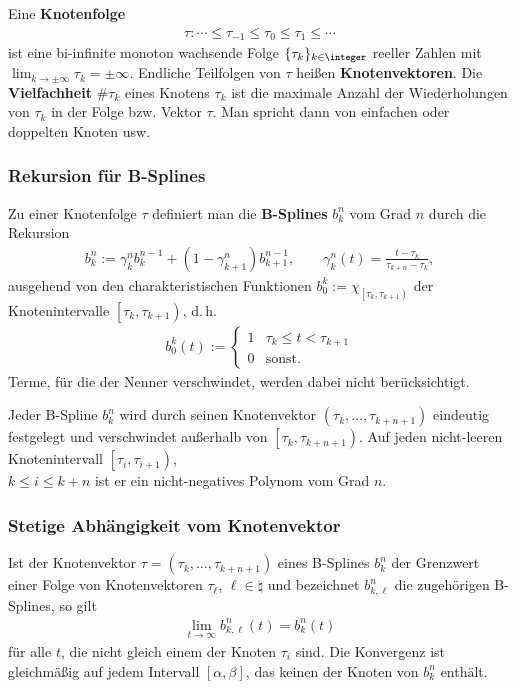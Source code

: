 Eine \textbf{Knotenfolge}
\begin{align*}
    \tau\colon \dotsb \le \tau_{-1} \le \tau_0 \le \tau_1 \le \dotsb
\end{align*}
ist eine bi-infinite monoton wachsende Folge $\{\tau_k\}_{k \in \integer}$
reeller Zahlen mit $\lim_{k \to \pm\infty} \tau_k = \pm\infty$.
Endliche Teilfolgen von $\tau$ heißen \textbf{Knotenvektoren}.
Die \textbf{Vielfachheit} $\#\tau_k$ eines Knotens $\tau_k$ ist die
maximale Anzahl der Wiederholungen von $\tau_k$ in der Folge bzw.
Vektor $\tau$.
Man spricht dann von einfachen oder doppelten Knoten usw.

\subsubsection{%
    Rekursion für B-Splines%
}

Zu einer Knotenfolge $\tau$ definiert man die \textbf{B-Splines} $b_k^n$
vom Grad $n$ durch die Rekursion
\begin{align*}
    b_k^n := \gamma_k^n b_k^{n-1} + (1 - \gamma_{k+1}^n)b_{k+1}^{n-1}, \qquad
    \gamma_k^n(t) = \frac{t - \tau_k}{\tau_{k+n} - \tau_k},
\end{align*}
ausgehend von den charakteristischen Funktionen
$b_0^k := \chi_{\left[\tau_k, \tau_{k+1}\right)}$ der Knotenintervalle
$\left[\tau_k, \tau_{k+1}\right)$, d.\,h.
\begin{align*}
    b_0^k(t) := \begin{cases}1 & \tau_k \le t < \tau_{k+1} \\
    0 & \text{sonst}.\end{cases}
\end{align*}
Terme, für die der Nenner verschwindet, werden dabei nicht berücksichtigt.

\linie

Jeder B-Spline $b_k^n$ wird durch seinen Knotenvektor
$(\tau_k, \dotsc, \tau_{k+n+1})$ eindeutig festgelegt und verschwindet
außerhalb von $\left[\tau_k, \tau_{k+n+1}\right)$.
Auf jeden nicht-leeren Knotenintervall $\left[\tau_i, \tau_{i+1}\right)$, \\
$k \le i \le k + n$ ist er ein nicht-negatives Polynom vom Grad $n$.

\subsubsection{%
    Stetige Abhängigkeit vom Knotenvektor%
}

Ist der Knotenvektor $\tau = (\tau_k, \dotsc, \tau_{k+n+1})$ eines B-Splines
$b_k^n$ der Grenzwert einer Folge von Knotenvektoren $\tau_\ell$,
$\ell \in \natural$ und bezeichnet $b_{k,\ell}^n$ die zugehörigen B-Splines,
so gilt
\begin{align*}
    \lim_{t \to \infty} b_{k,\ell}^n(t) = b_k^n(t)
\end{align*}
für alle $t$, die nicht gleich einem der Knoten $\tau_i$ sind.
Die Konvergenz ist gleichmäßig auf jedem Intervall $[\alpha, \beta]$,
das keinen der Knoten von $b_k^n$ enthält.

